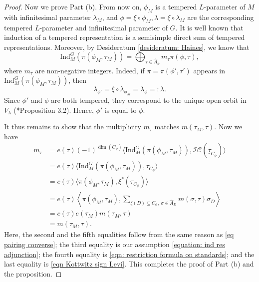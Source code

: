 \documentclass[11pt,letterpaper]{amsart}
\newcommand{\IC}{\mathcal{IC}}
\newcommand{\irrepdual}[1]{\widehat{#1}}
\newcommand{\Ind}{\mathrm{Ind}}
\newcommand{\locsys}[2]{\underline{#1}_{#2}}
\newcommand{\stsh}[2]{{#1}_{#2}}
\renewcommand{\1}{\mathbbm{1}}
\numberwithin{equation}{section}
\begin{document}
{\begin{proof}
Now we prove Part (b). From now on, $\phi_M$ is a tempered $L$-parameter of $M$ with infinitesimal parameter $\lambda_M$, and $\phi=\xi \circ \phi_M, \lambda= \xi \circ \lambda_M$ are the corresponding tempered $L$-parameter and infinitesimal parameter of $G$. It is well known that induction of a tempered representation is a semisimple direct sum of tempered representations. Moreover, by Desideratum \ref{desideratum: Haines}, we know that 
\[ \Ind_{M}^G (\pi(\phi_M,\tau_M))= \bigoplus_{\tau \in \irrepdual{A}_{\phi}} m_{\tau} \pi(\phi,\tau),\]
where $m_{\tau}$ are non-negative integers. Indeed, if $\pi=\pi(\phi',\tau')$ appears in $\Ind_M^G(\pi(\phi_M,\tau_M))$, then 
\[ \lambda_{\phi'}= \xi \circ \lambda_{\phi_M}= \lambda_{\phi}=:\lambda.\]
Since $\phi'$ and $\phi$ are both tempered, they correspond to the unique open orbit in $V_{\lambda}$ (\cite{cunningham2024whittakernormalizationpadicabvpackets}*{Proposition 3.2}). Hence, $\phi'$ is equal to $\phi$. 

It thus remains to show that the multiplicity $m_{\tau}$ matches $ m(\tau_M,\tau)$. Now we have 
\begin{align*}
    m_{\tau}& =  e(\tau) (-1)^{\dim(C_{\phi})} \langle \Ind_M^G (\pi(\phi_M,\tau_M)) , \IC(\locsys{\tau}{C_{\phi}}) \rangle\\
    &=e(\tau) \langle \Ind_M^G (\pi(\phi_M,\tau_M)) , \stsh{\tau}{C_{\phi}} \rangle \\
    &=e(\tau)  \langle \pi(\phi_{M}, \tau_M) , \xi^{\ast} (\stsh{\tau}{C_{\phi}})\rangle\\
    &= e(\tau)  \left\langle \pi(\phi_{M}, \tau_M) , \sum_{\xi (D) \subseteq C_{\phi},\ \sigma \in \irrepdual{A}_{D}} m(\sigma, \tau) \stsh{\sigma}{D}\right\rangle\\
    &= e(\tau) e(\tau_M) m(\tau_M, \tau)\\
    &= m(\tau_M, \tau).
\end{align*}
Here, the second and the fifth equalities follow from the same reason as \eqref{eq pairing converse}; the third equality is our assumption \eqref{equation: ind res adjunction}; the fourth equality is \eqref{eqn: restriction formula on standards}; and the last equality is \eqref{eqn Kottwitz sign Levi}. This completes the proof of Part (b) and the proposition.
\end{proof}

\iffalse
}
\end{document}
